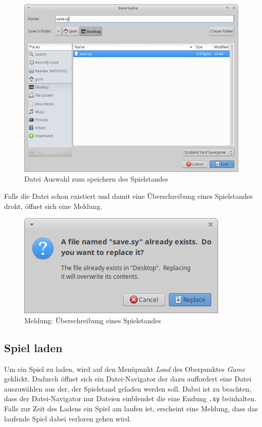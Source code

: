                 \begin{figure}[H]
                    \centering
                    \includegraphics[scale=0.4]{img/benutzerhandbuch/dialog_save_filechooser.png}   
                    \caption{Datei Auswahl zum speichern des Spielstandes}
                    \label{abb_dialog_save_filechooser}
                \end{figure}

                Falls die Datei schon existiert und damit eine Überschreibung eines Spielstandes droht,
                öffnet sich eine Meldung.
                \begin{figure}[H]
                    \centering
                    \includegraphics[scale=0.7]{img/benutzerhandbuch/dialog_save_replace.png}   
                    \caption{Meldung: Überschreibung eines Spielstandes}
                    \label{abb_dialog_save_replace}
                \end{figure}

                
        \subsection{Spiel laden}
            Um ein Spiel zu laden, wird auf den Menüpunkt \textit{Load} des Oberpunktes \textit{Game} geklickt.
            Dadurch öffnet sich ein Datei-Navigator der dazu auffordert eine Datei auszuwählen aus der,
            der Spielstand geladen werden soll. Dabei ist zu beachten, dass der Datei-Navigator nur Dateien einblendet die eine
            Endung \texttt{.sy} beinhalten. Falls zur Zeit des Ladens ein Spiel am laufen ist, erscheint eine
            Meldung, dass das laufende Spiel dabei verloren gehen wird.


